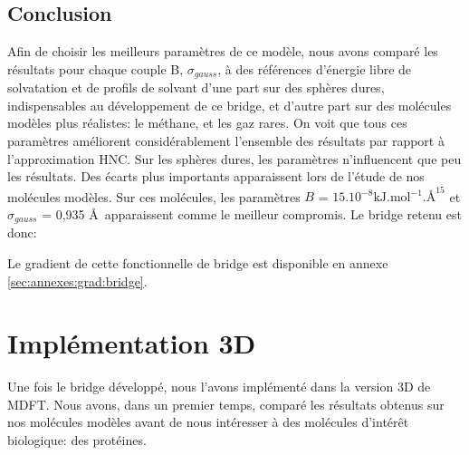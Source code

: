 \subsection{Conclusion}
Afin de choisir les meilleurs paramètres de ce modèle, nous avons comparé les résultats pour chaque couple B, $\sigma_{gauss}$, à des références d'énergie libre de solvatation et de profils de solvant d'une part sur des sphères dures, indispensables au développement de ce bridge, et d'autre part sur des molécules modèles plus réalistes: le méthane, et les gaz rares.
On voit que tous ces paramètres améliorent considérablement l'ensemble des résultats par rapport à l'approximation HNC. Sur les sphères dures, les paramètres n'influencent que peu les résultats. Des écarts plus importants apparaissent lors de l'étude de nos molécules modèles. Sur ces molécules, les paramètres $B$ = $15.10^{-8} \mathrm{kJ.mol}^{-1}.\text{\AA}^{15}$ et $\sigma_{gauss}$ = 0,935 \AA\ apparaissent comme le meilleur compromis. Le bridge retenu est donc:


Le gradient de cette fonctionnelle de bridge est disponible en annexe \ref{sec:annexes:grad:bridge}.

\section{Implémentation 3D}
Une fois le bridge développé, nous l'avons implémenté dans la version 3D de MDFT. Nous avons, dans un premier temps, comparé les résultats obtenus sur nos molécules modèles avant de nous intéresser à des molécules d’intérêt biologique: des protéines.


